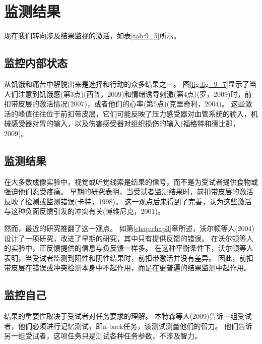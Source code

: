 \section{监测结果}
\par
现在我们转向涉及结果监视的激活，如表\ref{tab:9_5}所示。


\subsection{监控内部状态}
\par

从饥饿和痛苦中解脱出来是选择和行动的众多结果之一。
图\ref{fig:fig_9_7}显示了当人们注意到饥饿感(第3点)(西普，2009)和情绪诱导刺激(第4点)(罗，2009)时，前扣带皮层的激活情况(2007)，或者他们的心率(第5点)(克里奇利，2004)。
这些激活的峰值往往位于前扣带皮层，它们可能反映了压力感受器对血管系统的输入，机械感受器对胃的输入，以及伤害感受器对组织损伤的输入(福格特和德比郡，2009)。
\par



\subsection{监测结果}
\par
在大多数成像实验中，视觉或听觉线索是结果的信号，而不是为受试者提供食物或强迫他们忍受疼痛。
早期的研究表明，当受试者监测结果时，前扣带皮层的激活反映了检测或监测错误(卡特，1998)。
这一观点后来得到了完善，认为这些激活与这种负面反馈引发的冲突有关(博维尼克，2001)。
\par


然而，最近的研究推翻了这一观点。
如第\ref{chap:chap3}章所述，沃尔顿等人(2004)设计了一项研究，改进了早期的研究，其中只有提供反馈的错误。
在沃尔顿等人的实验中，正反馈提供的信息与负反馈一样多。
在这种平衡条件下，沃尔顿等人表明，当受试者监测到阳性和阴性结果时，前扣带激活并没有差异。
因此，前扣带皮层在错误或冲突检测本身中不起作用，而是在更普遍的结果监测中起作用。
\par



\subsection{监控自己}
\par
结果的重要性取决于受试者对任务要求的理解。
本特森等人(2009)告诉一组受试者，他们必须进行记忆测试，即n-back任务，该测试测量他们的智力。
他们告诉另一组受试者，这项任务只是测试各种任务参数，不涉及智力。
\par


